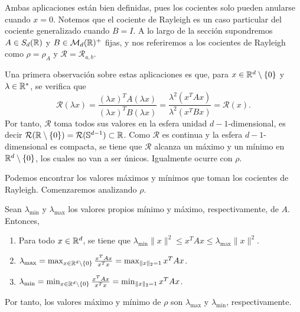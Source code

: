 Ambas aplicaciones están bien definidas, pues los cocientes solo pueden anularse cuando $x = 0$. Notemos que el cociente de Rayleigh es un caso particular del cociente generalizado cuando $B = I$. A lo largo de la sección supondremos $A \in S_d(\mathbb{R})$ y $B \in \mathcal{M}_d(\mathbb{R})^+$ fijas, y nos referiremos a los cocientes de Rayleigh como $\rho = \rho_A$ y $\mathcal{R} = \mathcal{R}_{a,b}$.

Una primera observación sobre estas aplicaciones es que, para $x \in \mathbb{R}^d \setminus \{0\}$ y $\lambda \in \mathbb{R}^*$, se verifica que
\[ \mathcal{R}(\lambda x) = \frac{(\lambda x)^TA(\lambda x)}{(\lambda x)^TB(\lambda x)} = \frac{\lambda^2(x^TAx)}{\lambda^2(x^TBx)} = \mathcal{R}(x). \]
Por tanto, $\mathcal{R}$ toma todos sus valores en la esfera unidad $d-1$-dimensional, es decir $\mathcal{R}(\mathbb{R} \setminus \{0\}) = \mathcal{R}(\mathbb{S}^{d-1}) \subset \mathbb{R}$. Como $\mathcal{R}$ es continua y la esfera $d-1$-dimensional es compacta, se tiene que $\mathcal{R}$ alcanza un máximo y un mínimo en $\mathbb{R}^d \setminus \{0\}$, los cuales no van a ser únicos. Igualmente ocurre con $\rho$.

Podemos encontrar los valores máximos y mínimos que toman los cocientes de Rayleigh. Comenzaremos analizando $\rho$.


\begin{thm}
    Sean $\lambda_{\min}$ y $\lambda_{\max}$ los valores propios mínimo y máximo, respectivamente, de $A$. Entonces,
    \begin{enumerate}
        \item Para todo $x \in \mathbb{R}^d$, se tiene que $\lambda_{\min} \|x\|^2 \le x^TAx \le \lambda_{\max}\|x\|^2$.
        \item $\lambda_{\max} = \max_{x \in \mathbb{R}^d \setminus \{0\}} \frac{x^TAx}{x^Tx} = \max_{\|x\|_2 = 1} x^TAx$.
        \item $\lambda_{\min} = \min_{x \in \mathbb{R}^d \setminus \{0\}} \frac{x^TAx}{x^Tx} = \min_{\|x\|_2 = 1} x^TAx$.
    \end{enumerate}
    Por tanto, los valores máximo y mínimo de $\rho$ son $\lambda_{\max}$ y $\lambda_{\min}$, respectivamente.
\end{thm}

